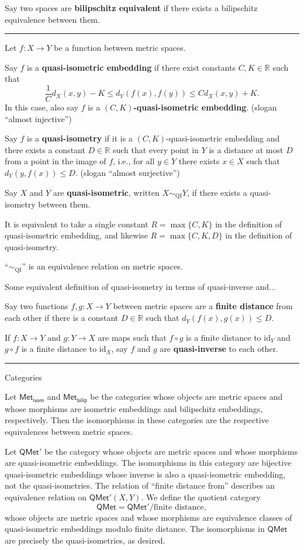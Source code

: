 \documentclass[12pt]{article}
\newcommand{\keyword}[1]{\textbf{#1}}
\newcommand{\sepline}{\rule{\textwidth}{0.4pt}}
\theoremstyle{definition}
\newcommand{\R}{\mathbb{R}}
\newcommand{\<}{\left\langle}
\renewcommand{\>}{\right\rangle}
\newcommand{\qisom}{\sim_\mathrm{QI}}
\newcommand{\id}{\mathrm{id}}
\newcommand{\QMet}{\mathsf{QMet}}
\begin{document}
Say two spaces are \keyword{bilipschitz equivalent} if there exists a bilipschitz equivalence between them.

\sepline

Let $f : X \to Y$ be a function between metric spaces.

Say $f$ is a \keyword{quasi-isometric embedding} if there exist constants $C, K \in \R$ such that 
\[
    \frac{1}{C} d_X(x, y) - K \leq d_Y(f(x), f(y)) \leq C d_X(x, y) + K.
\]
In this case, also say $f$ is a \keyword{$(C, K)$-quasi-isometric embedding}.
(slogan ``almost injective'')

Say $f$ is a \keyword{quasi-isometry} if it is a $(C, K)$-quasi-isometric embedding and there exists a constant $D \in \R$ such that every point in $Y$ is a distance at most $D$ from a point in the image of $f$, i.e., for all $y \in Y$ there exists $x \in X$ such that $d_Y(y, f(x)) \leq D$.
(slogan ``almost surjective'')

Say $X$ and $Y$ are \keyword{quasi-isometric}, written $X \qisom Y$, if there exists a quasi-isometry between them.


It is equivalent to take a single constant $R = \max\{C, K\}$ in the definition of quasi-isometric embedding, and likewise $R = \max\{C, K, D\}$ in the definition of quasi-isometry.

``$\qisom$'' is an equivalence relation on metric spaces.

Some equivalent definition of quasi-isometry in terms of quasi-inverse and...

Say two functions $f, g : X \to Y$ between metric spaces are a \keyword{finite distance} from each other if there is a constant $D \in \R$ such that $d_Y(f(x), g(x)) \leq D$.

If $f : X \to Y$ and $g : Y \to X$ are maps such that $f \circ g$ is a finite distance to $\id_Y$ and $g \circ f$ is a finite distance to $\id_X$, say $f$ and $g$ are \keyword{quasi-inverse} to each other.

\sepline

Categories

Let $\mathsf{Met_{isom}}$ and $\mathsf{Met_{bilip}}$ be the categories whose objects are metric spaces and whose morphisms are isometric embeddings and bilipschitz embeddings, respectively.
Then the isomorphisms in these categories are the respective equivalences between metric spaces.

Let $\QMet'$ be the category whose objects are metric spaces and whose morphisms are quasi-isometric embeddings.
The isomorphisms in this category are bijective quasi-isometric embeddings whose inverse is also a quasi-isometric embedding, not the quasi-isometries.
The relation of ``finite distance from'' describes an equivalence relation on $\QMet'(X, Y)$.
We define the quotient category
\[
    \QMet = \QMet'/\text{finite distance},
\]
whose objects are metric spaces and whose morphisms are equivalence classes of quasi-isometric embeddings modulo finite distance.
The isomorphisms in $\QMet$ are precisely the quasi-isometries, as desired.
\end{document}

